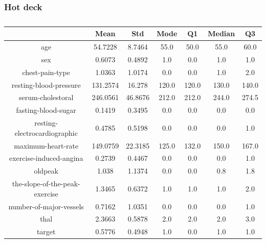 \documentclass{classrep}
\begin{document}
{{{            }

            \subsubsection{Hot deck}
            \label{results:30-percent:dot-deck} {
                \begin{table}[!htbp]
                    \centering
                    \begin{tabular}{|c|c|c|c|c|c|c|}
                        \hline
                        & Mean & Std & Mode & Q1 & Median & Q3 \\ \hline
                        age & 54.7228 & 8.7464 & 55.0 & 50.0 & 55.0 & 60.0 \\ \hline
                        sex & 0.6073 & 0.4892 & 1.0 & 0.0 & 1.0 & 1.0 \\ \hline
                        chest-pain-type & 1.0363 & 1.0174 & 0.0 & 0.0 & 1.0 & 2.0 \\ \hline
                        resting-blood-pressure & 131.2574 & 16.278 & 120.0 & 120.0 & 130.0 & 140.0 \\ \hline
                        serum-cholestoral & 246.0561 & 46.8676 & 212.0 & 212.0 & 244.0 & 274.5 \\ \hline
                        fasting-blood-sugar & 0.1419 & 0.3495 & 0.0 & 0.0 & 0.0 & 0.0 \\ \hline
                        resting-electrocardiographic & 0.4785 & 0.5198 & 0.0 & 0.0 & 0.0 & 1.0 \\ \hline
                        maximum-heart-rate & 149.0759 & 22.3185 & 125.0 & 132.0 & 150.0 & 167.0 \\ \hline
                        exercise-induced-angina & 0.2739 & 0.4467 & 0.0 & 0.0 & 0.0 & 1.0 \\ \hline
                        oldpeak & 1.038 & 1.1374 & 0.0 & 0.0 & 0.8 & 1.8 \\ \hline
                        the-slope-of-the-peak-exercise & 1.3465 & 0.6372 & 1.0 & 1.0 & 1.0 & 2.0 \\ \hline
                        number-of-major-vessels & 0.7162 & 1.0351 & 0.0 & 0.0 & 0.0 & 1.0 \\ \hline
                        thal & 2.3663 & 0.5878 & 2.0 & 2.0 & 2.0 & 3.0 \\ \hline
                        target & 0.5776 & 0.4948 & 1.0 & 0.0 & 1.0 & 1.0 \\ \hline
                    \end{tabular}
                    \caption{}
                    \label{result_30_Hot-deck}
                \end{table}
                \FloatBarrier

}}}
\end{document}
